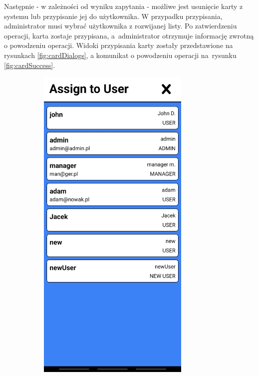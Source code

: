 Następnie - w zależności od wyniku zapytania - możliwe jest usunięcie karty z systemu lub przypisanie jej do użytkownika. W przypadku przypisania, administrator musi wybrać użytkownika z rozwijanej listy. Po zatwierdzeniu operacji, karta zostaje przypisana, a~administrator otrzymuje informację zwrotną o powodzeniu operacji. Widoki przypisania karty zostały przedstawione na rysunkach \ref{fig:cardDialogs}, a komunikat o powodzeniu operacji na~rysunku \ref{fig:cardSuccess}.

\begin{figure}
    \centering
    \begin{subfigure}[b]{0.3\textwidth}
        \centering
        \includegraphics[width=0.8\textwidth, frame]{graf/mobile/userList.jpg}

\end{subfigure}
\end{figure}
